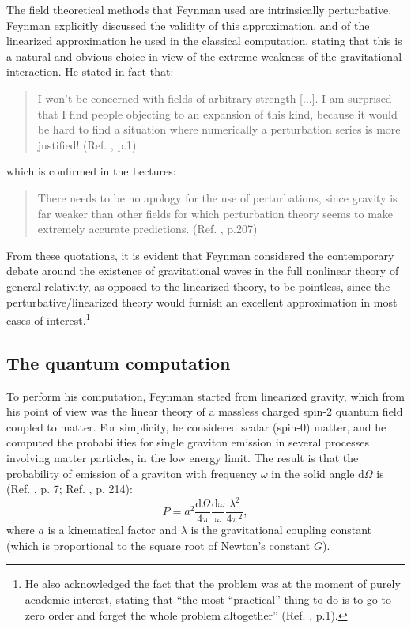 \documentclass{ws-procs961x669}            %
\begin{document}
The field theoretical methods that Feynman used are intrinsically
perturbative. Feynman explicitly discussed the validity of this
approximation, and of the linearized approximation he used in the
classical computation, stating that this is a natural and obvious
choice in view of the extreme weakness of the gravitational
interaction. He stated in fact that:
%
\begin{quote}
I won't be concerned with fields of arbitrary strength [...]. I am
surprised that I find people objecting to an expansion of this
kind, because it would be hard to find a situation where
numerically a perturbation series is more justified! (Ref.
, p.1)
\end{quote}
%
which is confirmed in the Lectures:
%
\begin{quote}
There needs to be no apology for the use of perturbations, since
gravity is far weaker than other fields for which perturbation
theory seems to make extremely accurate predictions. (Ref.
, p.207)
\end{quote}
%
From these quotations, it is evident that Feynman considered the
contemporary debate around the existence of gravitational waves in
the full nonlinear theory of general relativity, as opposed to the
linearized theory, to be pointless, since the
perturbative/linearized theory would furnish an excellent
approximation in most cases of interest.\footnote{He also
acknowledged the fact that the problem was at the moment of purely
academic interest, stating that ``the most ``practical'' thing to
do is to go to zero order and forget the whole problem
altogether'' (Ref. , p.1). }

\subsection{The quantum computation}

To perform his computation, Feynman started from linearized
gravity, which from his point of view was the linear theory of a
massless charged spin-2 quantum field coupled to matter. For
simplicity, he considered scalar (spin-0) matter, and he computed
the probabilities for single graviton emission in several
processes involving matter particles, in the low energy limit. The
result is that the probability of emission of a graviton with
frequency $\omega$ in the solid angle $\mathrm{d}\Omega$ is (Ref.
, p. 7; Ref. , p.
214):
%
\begin{equation}\label{quantum}
P=a^2\frac{\mathrm{d}\Omega}{4\pi}\frac{\mathrm{d}\omega}{\omega}\frac{\lambda^2}{4\pi^2},
\end{equation}
%
where $a$ is a kinematical factor and $\lambda$ is the
gravitational coupling constant (which is proportional to the
square root of Newton's constant $G$).
\end{document}
